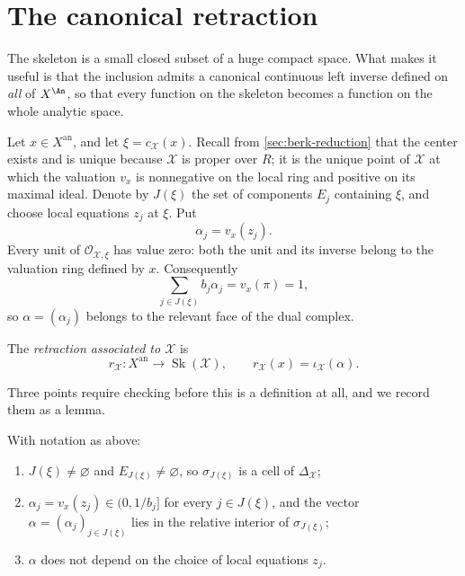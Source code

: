 \section{The canonical retraction}
\label{sec:skeleton-retraction}

The skeleton is a small closed subset of a huge compact space. What makes it
useful is that the inclusion admits a canonical continuous left inverse
defined on \emph{all} of $X^{\An}$, so that every function on the skeleton
becomes a function on the whole analytic space.

Let $x\in X^{\mathrm{an}}$, and let $\xi=c_{\mathcal X}(x)$. Recall from
\cref{sec:berk-reduction} that the center exists and is unique because
$\mathcal X$ is proper over $R$; it is the unique point of
$\mathcal X$ at which the valuation $v_x$ is nonnegative on the local
ring and positive on its maximal ideal. Denote by
$J(\xi)$ the set of components $E_j$ containing $\xi$, and choose local
equations $z_j$ at $\xi$. Put
\[
                         \alpha_j=v_x(z_j).
\]
Every unit of $\mathcal O_{\mathcal X,\xi}$ has value zero: both the unit
and its inverse belong to the valuation ring defined by $x$. Consequently
\[
                  \sum_{j\in J(\xi)}b_j\alpha_j=v_x(\pi)=1,
\]
so $\alpha=(\alpha_j)$ belongs to the relevant face of the dual complex.

\begin{definition}[Retraction]
\label{def:skeleton-retraction}
The \emph{retraction associated to $\mathcal X$} is
\[
 r_{\mathcal X}:X^{\mathrm{an}}\longrightarrow
 \operatorname{Sk}(\mathcal X),\qquad
 r_{\mathcal X}(x)=\iota_{\mathcal X}(\alpha).
\]
\end{definition}

Three points require checking before this is a definition at all, and we
record them as a lemma.

\begin{lemma}
\label{lem:retraction-well-defined}
With notation as above:
\begin{enumerate}
\item $J(\xi)\neq\varnothing$ and $E_{J(\xi)}\neq\varnothing$, so
  $\sigma_{J(\xi)}$ is a cell of $\Delta_{\mathcal X}$;
\item $\alpha_j=v_x(z_j)\in(0,1/b_j]$ for every $j\in J(\xi)$, and the
  vector $\alpha=(\alpha_j)_{j\in J(\xi)}$ lies in the relative interior
  of $\sigma_{J(\xi)}$;
\item $\alpha$ does not depend on the choice of local equations $z_j$.
\end{enumerate}
\end{lemma}

